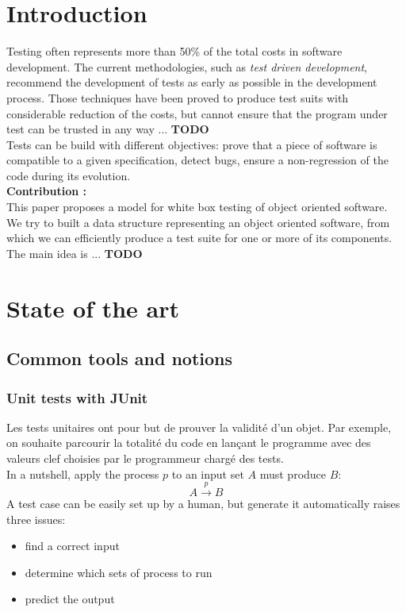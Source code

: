 \documentclass[a4paper]{report}
\begin{document}
\chapter*{Introduction}
Testing often represents more than 50\% of the total costs in software development. The current methodologies, such as \textit{test driven development}, recommend the development of tests as early as possible in the development process. Those techniques have been proved to produce test suits with considerable reduction of the costs, but cannot ensure that the program under test can be trusted in any way ...{\color{red} \textbf{TODO}}\\
Tests can be build with different objectives: prove that a piece of software is compatible to a given specification, detect bugs, ensure a non-regression of the code during its evolution.\\
\newline
\textbf{Contribution :}\\
This paper proposes a model for white box testing of object oriented software. We try to built a data structure representing an object oriented software, from which we can efficiently produce a test suite for one or more of its components. The main idea is ...{\color{red} \textbf{TODO}}\\





\chapter*{State of the art}


\section*{Common tools and notions}

\subsection*{Unit tests with JUnit}
Les tests unitaires ont pour but de prouver la validité d'un objet. Par exemple, on souhaite parcourir la totalité du code en lançant le programme avec des valeurs clef choisies par le programmeur chargé des tests.\\
In a nutshell, apply the process $p$ to an input set $A$ must produce $B$:\\
\[A \xrightarrow{p} B\]
A test case can be easily set up by a human, but generate it automatically raises three issues:
\begin{itemize}
\item find a correct input
\item determine which sets of process to run
\item predict the output
\end{itemize}
\end{document}
